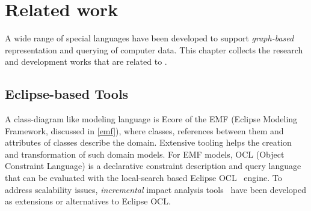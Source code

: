 \chapter{Related work}
\label{chap:related-work}

A wide range of special languages have been developed to support \emph{graph-based} representation and querying of computer data. This chapter collects the research and development works that are related to \iqd{}.

\section{Eclipse-based Tools}

A class-diagram like modeling language is Ecore of the EMF (Eclipse Modeling Framework, discussed in \autoref{emf}), where classes, references between them and attributes of classes describe the domain. 
Extensive tooling helps the creation and transformation of such domain models. For EMF models, OCL (Object Constraint Language) is a declarative constraint description and query language that can be evaluated with the local-search based Eclipse OCL~\cite{EclipseOCL} engine. To address scalability issues, \emph{incremental} impact analysis tools~\cite{OCLIA} have been developed as extensions or alternatives to Eclipse OCL.


% 
% 

